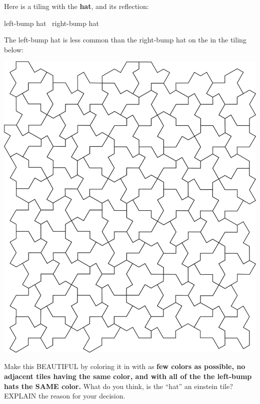 \documentclass[noauthor,nooutcomes,handout,hints,12pt]{ximera}
\begin{document}
\begin{question}
  Here is a tiling with the \textbf{hat}, and its reflection:
  \begin{center}
    left-bump hat~ right-bump hat
  \end{center}
  The left-bump hat is less common than the right-bump hat on the in
  the tiling below:
  \begin{center}
    \includegraphics[scale=.8]{hat.png}
  \end{center}
  Make this BEAUTIFUL by coloring it in with as \textbf{few colors as
    possible, no adjacent tiles having the same color, and with
  all of the the left-bump hats the SAME color.} What do you
  think, is the ``hat'' an einstein tile? EXPLAIN the reason for your
  decision.
\end{question}
\end{document}
